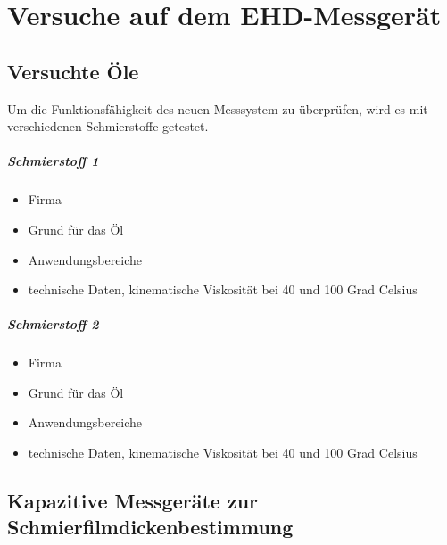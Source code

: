 \chapter{Versuche auf dem EHD-Messgerät}
\label{chap:versuche_auf_dem_ehd_messgeraet}

\section{Versuchte Öle}
\label{sec:versuchte_oele}

Um die Funktionsfähigkeit des neuen Messsystem zu überprüfen, wird es mit verschiedenen Schmierstoffe getestet.

\paragraph{Schmierstoff 1}
\label{par:schmierstoff_1}

\begin{itemize}
    \item Firma
    \item Grund für das Öl
    \item Anwendungsbereiche
    \item technische Daten, kinematische Viskosität bei 40 und 100 Grad Celsius
\end{itemize}

\paragraph{Schmierstoff 2}
\label{par:schmierstoff_2}

\begin{itemize}
    \item Firma
    \item Grund für das Öl
    \item Anwendungsbereiche
    \item technische Daten, kinematische Viskosität bei 40 und 100 Grad Celsius
\end{itemize}

\section{Kapazitive Messgeräte zur Schmierfilmdickenbestimmung}
\label{sec:kapazitive_messgeraete_zur_schmierfilmdickenbestimmung}

